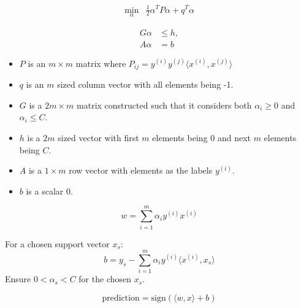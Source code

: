 \documentclass[12pt,a4paper]{article}
\begin{document}

\begin{align*}
\min_{\alpha} & \frac{1}{2} \alpha^T P \alpha + q^T \alpha
\end{align*}


\begin{align*}
G\alpha & \leq h, \\
A\alpha & = b
\end{align*}


\begin{itemize}
\item \( P \) is an \( m \times m \) matrix where \( P_{ij} = y^{(i)} y^{(j)} \langle x^{(i)}, x^{(j)} \rangle \)
\item \( q \) is an \( m \) sized column vector with all elements being -1.
\item \( G \) is a \( 2m \times m \) matrix constructed such that it considers both \( \alpha_i \geq 0 \) and \( \alpha_i \leq C \).
\item \( h \) is a \( 2m \) sized vector with first \( m \) elements being 0 and next \( m \) elements being \( C \).
\item \( A \) is a \( 1 \times m \) row vector with elements as the labels \( y^{(i)} \).
\item \( b \) is a scalar 0.
\end{itemize}


\[ w = \sum_{i=1}^{m} \alpha_i y^{(i)} x^{(i)} \]


For a chosen support vector \( x_s \): \\
\[ b = y_s - \sum_{i=1}^{m} \alpha_i y^{(i)} \langle x^{(i)}, x_s \rangle \]
Ensure \( 0 < \alpha_s < C \) for the chosen \( x_s \).

\[ \text{prediction} = \text{sign}(\langle w, x \rangle + b) \]
\end{document}
